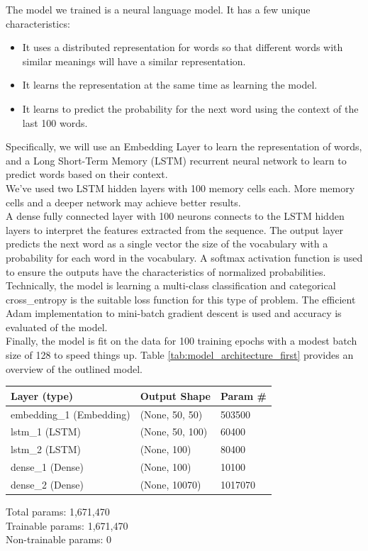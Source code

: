 \documentclass[hidelinks, conference]{IEEEtran}
\begin{document}
The model we trained is a neural language model. It has a few unique characteristics:

\begin{itemize}
\item It uses a distributed representation for words so that different words with similar meanings will have a similar representation.
\item It learns the representation at the same time as learning the model.
\item It learns to predict the probability for the next word using the context of the last 100 words.
\end{itemize}

Specifically, we will use an Embedding Layer to learn the representation of words, and a Long Short-Term Memory (LSTM) recurrent neural network to learn to predict words based on their context.\\
We’ve used two LSTM hidden layers with 100 memory cells each. More memory cells and a deeper network may achieve better results.\\
A dense fully connected layer with 100 neurons connects to the LSTM hidden layers to interpret the features extracted from the sequence. The output layer predicts the next word as a single vector the size of the vocabulary with a probability for each word in the vocabulary. A softmax activation function is used to ensure the outputs have the characteristics of normalized probabilities.\\
Technically, the model is learning a multi-class classification and categorical cross\_entropy is the suitable loss function for this type of problem. The efficient Adam implementation to mini-batch gradient descent is used and accuracy is evaluated of the model.\\
Finally, the model is fit on the data for 100 training epochs with a modest batch size of 128 to speed things up. Table \ref{tab:model_architecture_first} provides an overview of the outlined model.

\begin{center}
\begin{tabular}{l l l}
\hline
Layer (type) & Output Shape & Param \#\\
\hline
\hline
embedding\_1 (Embedding) & (None, 50, 50) & 503500\\
\hline
lstm\_1 (LSTM) & (None, 50, 100) & 60400\\
\hline
lstm\_2 (LSTM) & (None, 100) & 80400\\
\hline
dense\_1 (Dense) & (None, 100) & 10100\\
\hline
dense\_2 (Dense) & (None, 10070) & 1017070\\
\hline
\hline
\end{tabular}
\begin{flushleft}
Total params: 1,671,470\\
Trainable params: 1,671,470\\
Non-trainable params: 0
\end{flushleft}
\end{center}
\end{document}
